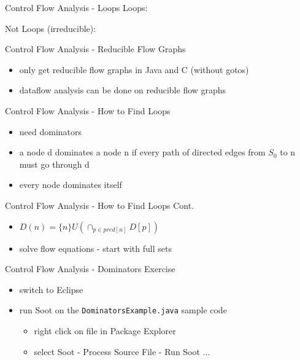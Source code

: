 \documentclass[mcgill,slideColor,colorBG,pdf]{prosper}
\begin{document}
\begin{slide} {Control Flow Analysis - Loops}
Loops:
\begin{center}
\end{center}
Not Loops (irreducible): 
\begin{center}
\end{center}
\end{slide}

\begin{slide} {Control Flow Analysis - Reducible Flow Graphs}
\begin{itemize}
\item only get reducible flow graphs in Java and C (without gotos)
\item dataflow analysis can be done on reducible flow graphs
\end{itemize}
\end{slide}

\begin{slide} {Control Flow Analysis - How to Find Loops}
\begin{itemize}
\item need dominators
\begin{center}
\end{center}
\item a node d dominates a node n if every path of directed edges from $S_0$ to n must go through d
\item every node dominates itself
\end{itemize}
\end{slide}

\begin{slide} {Control Flow Analysis - How to Find Loops Cont.}
\begin{center}
\end{center}
\begin{itemize}
\item $D(n) = \{n\} U (\cap_{p \in pred[n]} D[p])$
\item solve flow equations - start with full sets
\end{itemize}
\end{slide}

\begin{slide} {Control Flow Analysis - Dominators Exercise}
\begin{itemize}
\item switch to Eclipse
\item run Soot on the \texttt{DominatorsExample.java} sample code
\begin{itemize}
\item right click on file in Package Explorer
\item select Soot - Process Source File - Run Soot ...
\end{itemize}
\end{itemize}
\end{slide}
\end{document}
